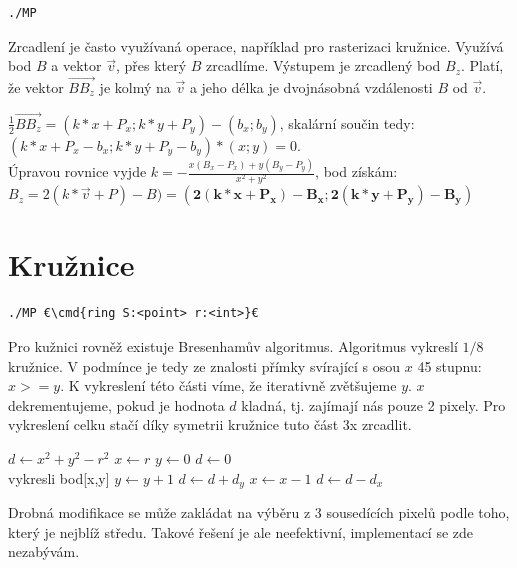 \documentclass[a4paper,12pt]{book}
\newcommand{\cmd}[1]{\textcolor{blue}{\textbf{#1}}}
\begin{document}
\begin{lstlisting}
./MP
\end{lstlisting}

Zrcadlení je často využívaná operace, například pro rasterizaci kružnice.
Využívá bod $B$ a vektor $\vec{v}$, přes který $B$ zrcadlíme. Výstupem je zrcadlený bod $B_{z}$.
Platí, že vektor $\overrightarrow{BB_{z}}$ je kolmý na $\vec{v}$ a jeho délka je dvojnásobná vzdálenosti $B$ od $\vec{v}$.


$\frac{1}{2} \overrightarrow{BB_{z}} = (k*x+P_x;k*y+P_y)-(b_x;b_y)$, skalární součin tedy:
\\$(k*x+P_x-b_x;k*y+P_y-b_y)*(x;y)=0$.
\\Úpravou rovnice vyjde $k = -\frac{x(B_x-P_x)+y(B_y-P_y)}{x^2+y^2}$, bod získám:
$B_z = 2(k*\vec{v}+P)-B) = \bm{(2(k*x+P_x)-B_x;2(k*y+P_y)-B_y)}$







\section{Kružnice} %


\begin{lstlisting}
./MP €\cmd{ring S:<point> r:<int>}€
\end{lstlisting}

Pro kužnici rovněž existuje Bresenhamův algoritmus. Algoritmus vykreslí $1/8$ kružnice. V podmínce je tedy ze znalosti přímky svírající s osou $x$ 45 stupnu: $x>=y$. K vykreslení této části víme, že iterativně zvětšujeme $y$. $x$ dekrementujeme, pokud je hodnota $d$ kladná, tj. zajímají nás pouze 2 pixely. %
Pro vykreslení celku stačí díky symetrii kružnice tuto část 3x zrcadlit.




\begin{algorithmic}
\State $d \gets x^2 + y^2 - r^2$
\State $x \gets r$
\State $y \gets 0$
\State $d \gets 0$
\\vykresli bod[x,y]
\State $y \gets y + 1$
\State $d \gets d + d_y$
    \State $x \gets x - 1$
    \State $d \gets d - d_x$
\EndIf 
\EndWhile
\end{algorithmic}

Drobná modifikace se může zakládat na výběru z 3 sousedících pixelů podle toho, který je nejblíž středu. Takové řešení je ale neefektivní, implementací se zde nezabývám.
\end{document}
